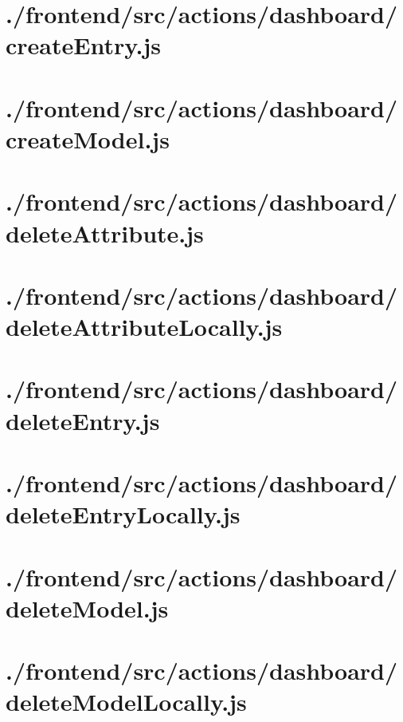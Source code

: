 \documentclass[11pt]{informatics-report}
\begin{document}
\newpage
\section{./frontend/src/actions/dashboard/createEntry.js}


\newpage
\section{./frontend/src/actions/dashboard/createModel.js}


\newpage
\section{./frontend/src/actions/dashboard/deleteAttribute.js}


\newpage
\section{./frontend/src/actions/dashboard/deleteAttributeLocally.js}


\newpage
\section{./frontend/src/actions/dashboard/deleteEntry.js}


\newpage
\section{./frontend/src/actions/dashboard/deleteEntryLocally.js}


\newpage
\section{./frontend/src/actions/dashboard/deleteModel.js}


\newpage
\section{./frontend/src/actions/dashboard/deleteModelLocally.js}

\end{document}
